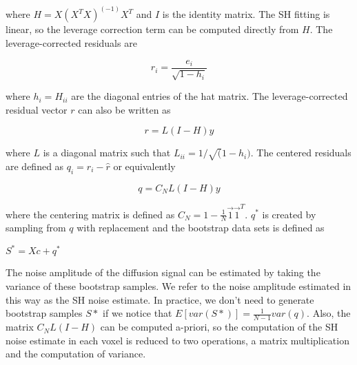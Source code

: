 where $H = X(X^TX)^(-1)X^T$ and $I$ is the identity matrix. The SH fitting is linear, so the
leverage correction term can be computed directly from $H$. The
leverage-corrected residuals are

\begin{equation}
r_i = \frac{e_i}{\sqrt{1 - h_i}}
\end{equation}

where $h_i = H_{ii}$ are the diagonal entries of the hat matrix. The leverage-corrected residual vector $r$ can also be written as

\begin{equation}
r = L(I - H)y
\end{equation}

where $L$ is a diagonal matrix such that $L_{ii} = 1 / \sqrt(1 - h_i)$. The centered residuals are defined as $q_i = r_i - \hat{r}$ or equivalently

\begin{equation}
q = C_NL(I - H)y
\end{equation}

where the centering matrix is defined as $C_N = 1 - \frac{1}{N}\vec{1}\vec{1}^T$. $q^*$ is created by sampling from $q$
with replacement and the bootstrap data sets is defined as

$S^* = Xc + q^*$

The noise amplitude of the diffusion signal can be estimated by taking
the variance of these bootstrap samples. We refer to the noise amplitude
estimated in this way as the SH noise estimate. In practice, we don't
need to generate bootstrap samples $S*$ if we notice that $E[var(S*)] = \frac{1}{N - 1}var(q)$. Also, the matrix $C_NL(I - H)$
can be computed a-priori, so the computation of the SH noise estimate in
each voxel is reduced to two operations, a matrix multiplication and the
computation of variance.

